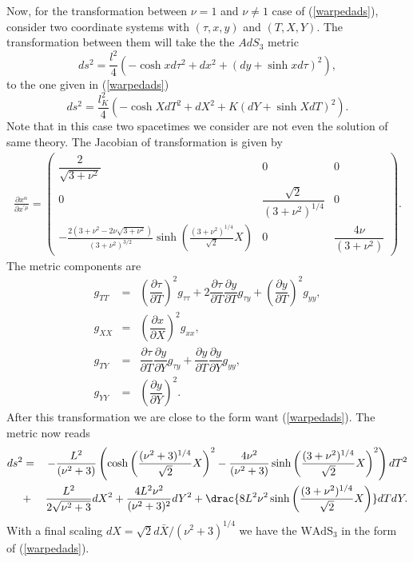 \documentclass[preprint,aps,tightenlines,showkeys,nofootinbib,superscriptaddress,amsmath]{revtex4}
\begin{document}
Now, for the transformation between $\nu =1$ and $\nu \neq 1$ case of
(\ref{warpedads}), consider two coordinate systems with
$(\tau,x,y)$ and $(T,X,Y)$. The transformation between them will take
the the $AdS_3$ metric
\begin{equation}
  ds^{2}=\frac{l^{2}}{4}\left(-\cosh x d\tau^{2}+dx^{2}+(dy+\sinh
  x d\tau )^{2} \right),
\end{equation}
to the one given in (\ref{warpedads})
\begin{equation}
  ds^{2}=\dfrac{l^{2}_K}{4}\left(-\cosh X dT^{2}+dX^{2}+K(dY+\sinh
  X dT )^{2}   \right)\label{warpedads}.
\end{equation}
Note that in this case two spacetimes we consider are not even the
solution of same theory. The Jacobian of transformation is given by
\begin{eqnarray}
  \frac{\partial x^{\alpha} }{\partial x^{\prime\mu} }=
  \begin{pmatrix}
    \dfrac{2}{\sqrt{3+\nu ^{2} } } & 0 & 0 \\
    0 & \dfrac{\sqrt{2}}{(3+\nu ^{2} ) ^{1 / 4}}    & 0 \\
    -\frac{2(3+\nu ^{2}-2 \nu \sqrt{3+\nu ^{2} }  )}{(3+\nu ^{2} )
    ^{3/2 }}\sinh \left(\frac{(3+\nu ^{2})^{1 / 4}}{\sqrt{2}}X\right)  & 0 &
    \dfrac{4 \nu }{(3+\nu ^{2})}
  \end{pmatrix}. \label{jacobwads}
\end{eqnarray}
The metric components are
\begin{eqnarray}
  g_{TT}&=&\left(\dfrac{\partial\tau}{\partial T}\right) ^{2} g_{\tau
  \tau }+ 2 \dfrac{\partial \tau}{\partial T}\dfrac{\partial
  y}{\partial T}g_{\tau y}+\left(\dfrac{\partial y}{\partial
  T}\right)^{2} g_{yy},\\
  g_{XX}&=& \left(\dfrac{\partial x}{\partial X}\right)^{2} g_{x x},\\
  g_{TY}&=& \dfrac{\partial \tau}{\partial T}\dfrac{\partial
  y}{\partial Y}g_{\tau y}+\dfrac{\partial y}{\partial
  T}\dfrac{\partial y}{\partial Y}g_{yy},\\
  g_{YY}&=&\left(\dfrac{\partial y}{\partial Y}\right)^{2}.
\end{eqnarray}
After this transformation we are close to the form want (\ref{warpedads}).
The metric now reads
\begin{eqnarray}
  ds^{2}&=&-\dfrac{L ^{2} }{(\nu ^{2}+3)}\left(\cosh \left(\frac{(\nu
    ^{2}+3)^{1 / 4}}{\sqrt{2}}X\right)^{2}-\dfrac{4 \nu ^{2} }{(\nu
    ^{2}+ 3 )}\sinh \left(\frac{(3+\nu
  ^{2})^{1 / 4}}{\sqrt{2}} X \right)^{2}  \right)dT^{2}\\
  &+& \dfrac{L^{2} }{2\sqrt{\nu ^{2}+3 } }dX^{2}+\dfrac{4 L^{2} \nu
  ^{2} }{(\nu ^{2}+3 )^{2} }dY^{2}+\drac{8L^{2}\nu ^{2}\sinh \left(\frac{(3+\nu
  ^{2})^{1 / 4}}{\sqrt{2}} X \right)  }dT dY.
\end{eqnarray}
With a final scaling $dX=\sqrt{2} d\bar X / (\nu ^{2}+3 )^{1 / 4} $
we have the $\text{WAdS}_{3}$ in the form of (\ref{warpedads}).
\end{document}

